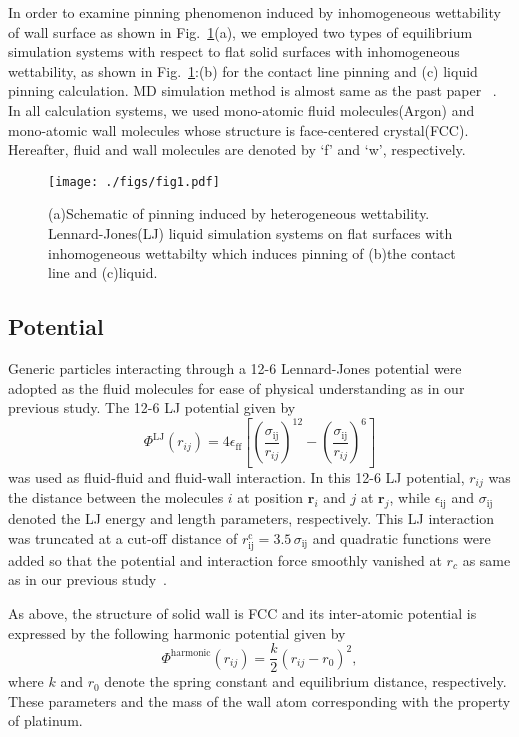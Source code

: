In order to examine pinning phenomenon induced by inhomogeneous wettability of wall surface as shown in Fig.~\ref{fig:systems}(a),
we employed two types of equilibrium simulation systems 
with respect to flat solid surfaces with inhomogeneous wettability, as shown in Fig.~\ref{fig:systems}:(b) for the contact line pinning and (c) liquid pinning calculation.
MD simulation method is almost same as the past paper~\cite{Yamaguchi2019} .
In all calculation systems, we used mono-atomic fluid molecules(Argon) and mono-atomic wall molecules 
whose structure is face-centered crystal(FCC).
Hereafter, fluid and wall molecules are denoted by `f' and `w', respectively.

\begin{figure}
  \begin{center}
    \texttt{[image: ./figs/fig1.pdf]}
  \end{center} 
  \caption{\label{fig:systems}
(a)Schematic of pinning induced by heterogeneous wettability.
    Lennard-Jones(LJ) liquid simulation systems on flat surfaces 
with inhomogeneous wettabilty which induces pinning of (b)the contact line
and (c)liquid.
  }
\end{figure}

\subsection{Potential}
Generic particles interacting through a 12-6 Lennard-Jones potential were adopted as the fluid molecules 
for ease of physical understanding as in our previous study.
The 12-6 LJ potential given by 
\begin{equation}
  \label{eq:LJ}
  \Phi^\mathrm{LJ}(r_{ij})=
  4\epsilon_\mathrm{ff} \left[
    \left(\frac{\sigma_\mathrm{ij}}{r_{ij}}\right)^{12} 
    -
    \left(\frac{\sigma_\mathrm{ij}}{r_{ij}}\right)^{6} 
   \right]
\end{equation}
was used as fluid-fluid and fluid-wall interaction.
In this 12-6 LJ potential, $r_{ij}$ was the distance between the
molecules $i$ at position 
$\bm{r}_{i}$ and $j$ at $\bm{r}_{j}$, while 
$\epsilon_\mathrm{ij}$ and $\sigma_\mathrm{ij}$ 
denoted the LJ energy and length parameters, 
respectively. 
This LJ interaction was truncated at a cut-off 
distance of $r^\mathrm{c}_\mathrm{ij}=3.5\,\sigma_\mathrm{ij}$ 
and quadratic functions were added so that the potential 
and interaction force smoothly vanished at $r_{c}$
as same as in our previous study~\cite{Yamaguchi2019}.

As above, the structure of solid wall is FCC and
 its inter-atomic potential is expressed by the following harmonic potential given by
\begin{equation}
\Phi^\mathrm{harmonic}(r_{ij})=
\frac{k}{2}(r_{ij}-r_{0})^{2},
\end{equation}
where $k$ and $r_{0}$ denote the spring constant and equilibrium distance, respectively.
These parameters and the mass of the wall atom corresponding with the property of platinum.

